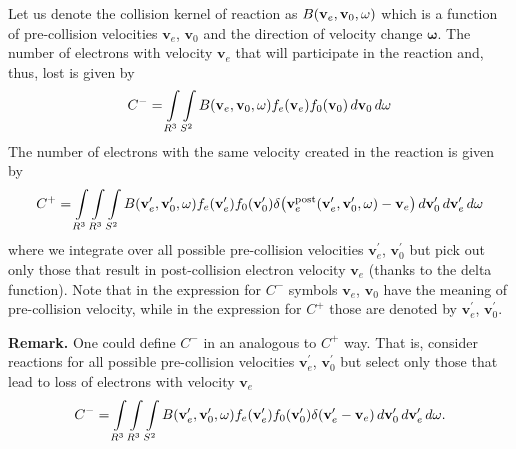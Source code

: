 \documentclass{article}
\newcommand{\myint}{\int\limits}
\newcommand{\diff}[1]{\, d#1}
\newcommand{\vect}[1]{\mathbf{#1}}
\newcommand{\of}[1]{\mleft( #1 \mright)}
\begin{document}
Let us denote the collision kernel of reaction as $B\of{\vect{v}_e, \vect{v}_0, \vect{\omega}}$ which is a function of pre-collision velocities $\vect{v}_e$, $\vect{v}_0$ and the direction of velocity change $\vect{\omega}$. The number of electrons with velocity $\vect{v}_e$ that will participate in the reaction and, thus, lost is given by 
\begin{align*}
C^- = \myint_{R^3} \myint_{S^2} B\of{\vect{v}_e, \vect{v}_0, \vect{\omega}} f_e\of{\vect{v}_e} f_0\of{\vect{v}_0} \diff{\vect{v}_0} \diff{\vect{\omega}}
\end{align*}
The number of electrons with the same velocity created in the reaction is given by
\begin{align*}
C^+ = \myint_{R^3} \myint_{R^3} \myint_{S^2} 
B\of{\vect{v}_e^\prime, \vect{v}_0^\prime, \vect{\omega}} 
f_e\of{\vect{v}_e^\prime} f_0\of{\vect{v}_0^\prime} 
\delta\of{\vect{v}_e^\text{post}\of{\vect{v}_e^\prime, \vect{v}_0^\prime, \vect{\omega}} - \vect{v}_e} 
\diff{\vect{v}_0^\prime} \diff{\vect{v}_e^\prime} \diff{\vect{\omega}}
\end{align*}
where we integrate over all possible pre-collision velocities $\vect{v}_e^\prime$, $\vect{v}_0^\prime$ but pick out only those that result in post-collision electron velocity $\vect{v}_e$ (thanks to the delta function). Note that in the expression for $C^-$ symbols $\vect{v}_e$, $\vect{v}_0$ have the meaning of pre-collision velocity, while in the expression for $C^+$ those are denoted by $\vect{v}_e^\prime$, $\vect{v}_0^\prime$. 

\textbf{Remark.} One could define $C^-$ in an analogous to $C^+$ way. That is, consider reactions for all possible pre-collision velocities $\vect{v}_e^\prime$, $\vect{v}_0^\prime$ but select only those that lead to loss of electrons with velocity $\vect{v}_e$
\begin{align*}
C^- = \myint_{R^3} \myint_{R^3} \myint_{S^2} 
B\of{\vect{v}_e^\prime, \vect{v}_0^\prime, \vect{\omega}} 
f_e\of{\vect{v}_e^\prime} f_0\of{\vect{v}_0^\prime} 
\delta\of{\vect{v}_e^\prime - \vect{v}_e} 
\diff{\vect{v}_0^\prime} \diff{\vect{v}_e^\prime} \diff{\vect{\omega}}.
\end{align*}
\end{document}
